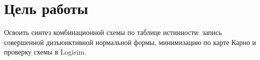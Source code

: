 \section{Цель работы}
Освоить синтез комбинационной схемы по таблице истинности: запись совершенной дизъюнктивной
нормальной формы, минимизацию по карте Карно и проверку схемы в Logisim.
